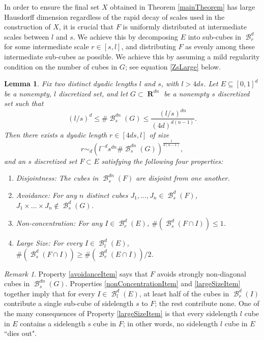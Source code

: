 \documentclass[dvipsnames,letterpaper,12pt]{article}
\numberwithin{equation}{section}
\theoremstyle{plain}
\newtheorem{lemma}{Lemma}
\theoremstyle{remark}
\newtheorem*{remark}{Remark}
\DeclareMathOperator{\RR}{\mathbf{R}}
\DeclareMathOperator{\B}{\mathcal{B}}
\begin{document}
In order to ensure the final set $X$ obtained in Theorem \ref{mainTheorem} has large Hausdorff dimension regardless of the rapid decay of scales used in the construction of $X$, it is crucial that $F$ is uniformly distributed at intermediate scales between $l$ and $s$. We achieve this by decomposing $E$ into sub-cubes in $\B^d_r$ for some intermediate scale $r \in [s,l]$, and distributing $F$ as evenly among these intermediate sub-cubes as possible. We achieve this by assuming a mild regularity condition on the number of cubes in $G$;  see equation \eqref{ZsLarge} below.
%

\begin{lemma} \label{discretelemma}
	Fix two distinct dyadic lengths $l$ and $s$, with $l > 4ds$. Let $E \subseteq [0,1]^d$ be a nonempty, $l$ discretized set, and let $G\subset\RR^{dn}$ be a nonempty $s$ discretized set such that
	\begin{equation}\label{ZsLarge}
		(l/s)^d \leq \# \B^{dn}_s(G)  \leq \frac{(l/s)^{dn}}{(4d)^{d(n-1)}}.
	\end{equation} 
	Then there exists a dyadic length $r \in [4ds,l]$ of size
	\begin{equation} \label{rBound}
	 	r \sim_d \left( l^{-d} s^{dn} \# \B^{dn}_s(G) \right)^{\frac{1}{d(n-1)}},
	\end{equation}
	and an $s$ discretized set $F \subset E$ satisfying the following four properties:
	\begin{enumerate}
		\item \label{disjointness} \emph{Disjointness}: The cubes in $\B^{dn}_s(F)$ are disjoint from one another.

		\item\label{avoidanceItem} \emph{Avoidance}: For any $n$ distinct cubes $J_1, \dots, J_n \in \B^d_s(F)$, $J_1 \times \dots \times J_n \not \in \B^d_s(G)$.

		\item\label{nonConcentrationItem} \emph{Non-concentration}: For any $I \in \B_r^d(E)$, $\#(\B_s^d(F \cap I)) \leq 1$.

		\item\label{largeSizeItem} \emph{Large Size}: For every $I \in \B^d_l(E)$, $\#(\B^d_s(F \cap I)) \geq \#(\B^d_r(E \cap I))/2$.
	\end{enumerate}
\end{lemma}

\begin{remark}
	Property \ref{avoidanceItem} says that $F$ avoids strongly non-diagonal cubes in $\B^{dn}_s(G)$.  Properties \ref{nonConcentrationItem} and \ref{largeSizeItem} together imply that for every $I \in \B^d_l(E)$, at least half of the cubes in $\B_r^d(I)$ contribute a single sub-cube of sidelength $s$ to $F$; the rest contribute none. One of the many consequences of Property \ref{largeSizeItem} is that every sidelength $l$ cube in $E$ contains a  sidelength $s$ cube in $F$; in other words, no sidelength $l$ cube in $E$ ``dies out".
\end{remark}
\end{document}
